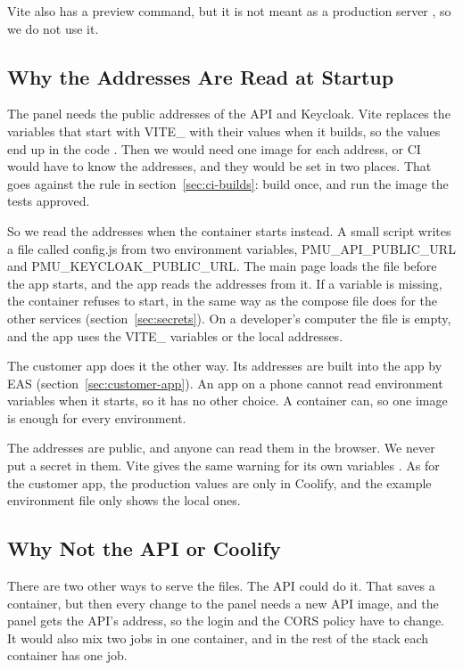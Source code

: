 \documentclass[a4paper,11pt]{article}
\begin{document}
Vite also has a preview command, but it is not meant as a production server \cite{vite-static-deploy}, so we do not use it.

\subsection{Why the Addresses Are Read at Startup}
The panel needs the public addresses of the API and Keycloak. Vite replaces the variables that start with VITE\_ with their values when it builds, so the values end up in the code \cite{vite-env-and-mode}. Then we would need one image for each address, or CI would have to know the addresses, and they would be set in two places. That goes against the rule in section~\ref{sec:ci-builds}: build once, and run the image the tests approved.

So we read the addresses when the container starts instead. A small script writes a file called config.js from two environment variables, PMU\_API\_PUBLIC\_URL and PMU\_KEYCLOAK\_PUBLIC\_URL. The main page loads the file before the app starts, and the app reads the addresses from it. If a variable is missing, the container refuses to start, in the same way as the compose file does for the other services (section~\ref{sec:secrets}). On a developer's computer the file is empty, and the app uses the VITE\_ variables or the local addresses.

The customer app does it the other way. Its addresses are built into the app by EAS (section~\ref{sec:customer-app}). An app on a phone cannot read environment variables when it starts, so it has no other choice. A container can, so one image is enough for every environment.

The addresses are public, and anyone can read them in the browser. We never put a secret in them. Vite gives the same warning for its own variables \cite{vite-env-and-mode}. As for the customer app, the production values are only in Coolify, and the example environment file only shows the local ones.

\subsection{Why Not the API or Coolify}
There are two other ways to serve the files. The API could do it. That saves a container, but then every change to the panel needs a new API image, and the panel gets the API's address, so the login and the CORS policy have to change. It would also mix two jobs in one container, and in the rest of the stack each container has one job.
\end{document}

